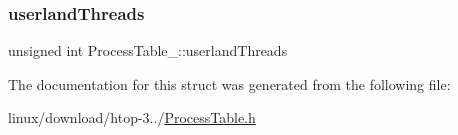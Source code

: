 \mbox{\label{structProcessTable___ad891156131ecad5a8e3582b573d5cfe4}} 
\subsubsection{\texorpdfstring{userland\+Threads}{userlandThreads}}
{\footnotesize\ttfamily unsigned int Process\+Table\+\_\+\+::userland\+Threads}



The documentation for this struct was generated from the following file\+:\begin{DoxyCompactItemize}
\item 
linux/download/htop-\/3../\hyperlink{ProcessTable_8h}{Process\+Table.\+h}\end{DoxyCompactItemize}
